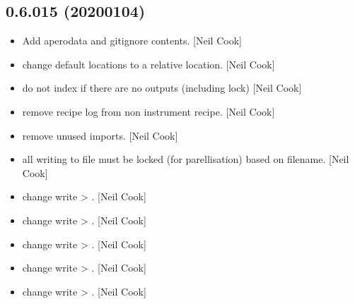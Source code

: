 \documentclass[a4paper,10pt,english]{report}
\begin{document}
\subsection{0.6.015 (2020\sphinxhyphen{}01\sphinxhyphen{}04)}
\label{\detokenize{misc/changelog:id23}}\begin{itemize}
\item {} 
Add apero\sphinxhyphen{}data and gitignore contents. {[}Neil Cook{]}

\item {} 
 \sphinxhyphen{} change default locations
to a relative location. {[}Neil Cook{]}

\item {} 
 \sphinxhyphen{} do not index if there are no outputs
(including lock) {[}Neil Cook{]}

\item {} 
 \sphinxhyphen{} remove recipe log from non\sphinxhyphen{}
instrument recipe. {[}Neil Cook{]}

\item {} 
 \sphinxhyphen{} remove unused imports. {[}Neil Cook{]}

\item {} 
 \sphinxhyphen{} all writing to file must be locked (for
parellisation) based on filename. {[}Neil Cook{]}

\item {} 
 \sphinxhyphen{} change write \textendash{}\textgreater{} . {[}Neil Cook{]}

\item {} 
 \sphinxhyphen{} change write \textendash{}\textgreater{} . {[}Neil Cook{]}

\item {} 
 \sphinxhyphen{} change write \textendash{}\textgreater{} . {[}Neil Cook{]}

\item {} 
 \sphinxhyphen{} change write \textendash{}\textgreater{} . {[}Neil Cook{]}

\item {} 
 \sphinxhyphen{} change write \textendash{}\textgreater{} . {[}Neil Cook{]}


\end{itemize}
\end{document}
